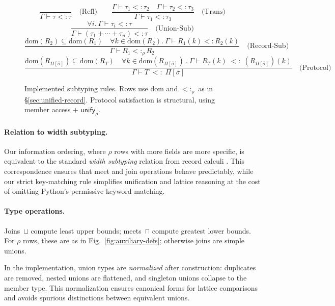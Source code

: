 \begin{figure*}[t]
\centering
\[
\frac{}{\Gamma \vdash \tau <: \tau} \quad \text{(Refl)}
\qquad
\frac{\Gamma \vdash \tau_1 <: \tau_2 \quad \Gamma \vdash \tau_2 <: \tau_3}{\Gamma \vdash \tau_1 <: \tau_3} \quad \text{(Trans)}
\]
\[
\frac{\forall i.\ \Gamma \vdash \tau_i <: \tau}{\Gamma \vdash (\tau_1 + \cdots + \tau_n) <: \tau} \quad \text{(Union-Sub)}
\]
\[
\frac{\mathrm{dom}(R_2) \subseteq \mathrm{dom}(R_1) \quad \forall k \in \mathrm{dom}(R_2).\ \Gamma \vdash R_1(k) <: R_2(k)}
     {\Gamma \vdash R_1 <:_\rho R_2} \quad \text{(Record-Sub)}
\]
\[
\frac{\mathrm{dom}(R_{\Pi[\overline{\sigma}]}) \subseteq \mathrm{dom}(R_T)
      \quad \forall k \in \mathrm{dom}(R_{\Pi[\overline{\sigma}]})\ .\ \Gamma \vdash R_T(k) \;<:\; (R_{\Pi[\overline{\sigma}]}\!)(k)}
     {\Gamma \vdash T \;<:\; \Pi[\overline{\sigma}]} \quad \text{(Protocol)}
\]
\caption{Implemented subtyping rules. Rows use $\mathrm{dom}$ and $<:_\rho$ as in \S\ref{sec:unified-record}. Protocol satisfaction is structural, using member access + $\mathsf{unify}_{\rho}$.}
\label{fig:subtyping}
\end{figure*}

\paragraph{Relation to width subtyping.}
Our information ordering, where $\rho$ rows with more fields are more specific, is
equivalent to the standard \emph{width subtyping} relation from record calculi
\cite{cardelli1992extensible}. This correspondence ensures that meet and join operations
behave predictably, while our strict key-matching rule simplifies unification and
lattice reasoning at the cost of omitting Python’s permissive keyword matching.

\paragraph{Type operations.}  
Joins~$\sqcup$ compute least upper bounds; meets~$\sqcap$ compute greatest lower bounds.  
For $\rho$ rows, these are as in Fig.~\ref{fig:auxiliary-defs}; otherwise joins are simple unions.

In the implementation, union types are \emph{normalized} after construction: duplicates are removed, nested unions are flattened, and singleton unions collapse to the member type.  
This normalization ensures canonical forms for lattice comparisons and avoids spurious distinctions between equivalent unions.

